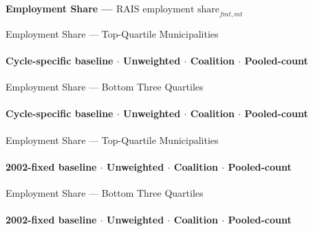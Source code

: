 \documentclass[aspectratio=169,10pt]{beamer}
\newcommand{\tabledir}{../tables/firm}
\begin{document}

\begin{frame}[plain]
\begin{center}
{\Large\textbf{Employment Share --- $\text{RAIS employment share}_{fmt,mt}$}}
\end{center}
\end{frame}


\begin{frame}[t,shrink=5]{Employment Share --- Top-Quartile Municipalities}
\framesubtitle{Cycle-specific baseline $\cdot$ Unweighted $\cdot$ Coalition $\cdot$ Pooled-count}
\begin{center}\footnotesize

\end{center}
\end{frame}

\begin{frame}[t,shrink=5]{Employment Share --- Bottom Three Quartiles}
\framesubtitle{Cycle-specific baseline $\cdot$ Unweighted $\cdot$ Coalition $\cdot$ Pooled-count}
\begin{center}\footnotesize

\end{center}
\end{frame}


\begin{frame}[t,shrink=5]{Employment Share --- Top-Quartile Municipalities}
\framesubtitle{2002-fixed baseline $\cdot$ Unweighted $\cdot$ Coalition $\cdot$ Pooled-count}
\begin{center}\footnotesize

\end{center}
\end{frame}

\begin{frame}[t,shrink=5]{Employment Share --- Bottom Three Quartiles}
\framesubtitle{2002-fixed baseline $\cdot$ Unweighted $\cdot$ Coalition $\cdot$ Pooled-count}
\begin{center}\footnotesize

\end{center}
\end{frame}
\end{document}
